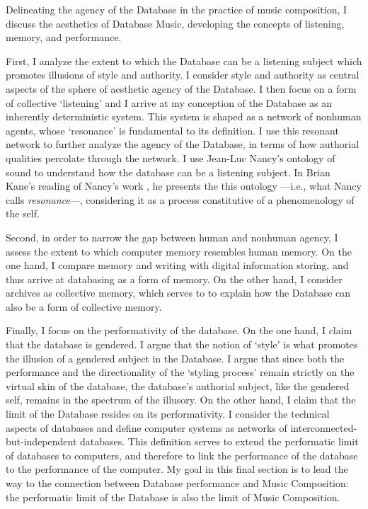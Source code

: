 Delineating the agency of the Database in the practice of music composition, I discuss the aesthetics of Database Music, developing the concepts of listening, memory, and performance. 

First, I analyze the extent to which the Database can be a listening subject which promotes illusions of style and authority. I consider style and authority as central aspects of the sphere of aesthetic agency of the Database. I then focus on a form of collective `listening' and I arrive at my conception of the Database as an inherently deterministic system. This system is shaped as a network of nonhuman agents, whose `resonance' is fundamental to its definition. I use this resonant network to further analyze the agency of the Database, in terms of how authorial qualities percolate through the network. I use Jean-Luc Nancy's ontology of sound to understand how the database can be a listening subject. In Brian Kane's reading \parencite[143-144]{Gra15:The} of Nancy's work \parencite{Nan07:Lis}, he presents the this ontology ---i.e., what Nancy calls \textit{resonance}---, considering it as a process constitutive of a phenomenology of the self. 

% 
% 

Second, in order to narrow the gap between human and nonhuman agency, I assess the extent to which computer memory resembles human memory. On the one hand, I compare memory and writing with digital information storing, and thus arrive at databasing as a form of memory. On the other hand, I consider archives as collective memory, which serves to to explain how the Database can also be a form of collective memory. 

Finally, I focus on the performativity of the database. On the one hand, I claim that the database is gendered. I argue that the notion of `style' is what promotes the illusion of a gendered subject in the Database. I argue that since both the performance and the directionality of the `styling process' remain strictly on the virtual skin of the database, the database's authorial subject, like the gendered self, remains in the spectrum of the illusory. On the other hand, I claim that the limit of the Database resides on its performativity. I consider the technical aspects of databases and define computer systems as networks of interconnected-but-independent databases. This definition serves to extend the performatic limit of databases to computers, and therefore to link the performance of the database to the performance of the computer. My goal in this final section is to lead the way to the connection between Database performance and Music Composition: the performatic limit of the Database is also the limit of Music Composition.

